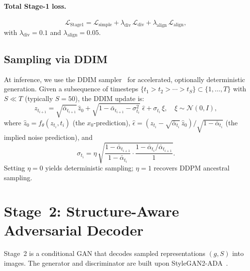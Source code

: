 \documentclass[12pt]{article}
\begin{document}
\paragraph{Total Stage-1 loss.}
\begin{equation}\label{eq:total-stage1-loss}
    \mathcal{L}_{\mathrm{Stage1}}
    = \mathcal{L}_{\mathrm{simple}}
    + \lambda_{\mathrm{div}}\, \mathcal{L}_{\mathrm{div}}
    + \lambda_{\mathrm{align}}\, \mathcal{L}_{\mathrm{align}},
\end{equation}
with $\lambda_{\mathrm{div}} = 0.1$ and $\lambda_{\mathrm{align}} = 0.05$.

\subsection{Sampling via DDIM}
\label{sec:ddim}

At inference, we use the DDIM sampler~\cite{song2021ddim}
for accelerated, optionally deterministic generation.
Given a subsequence of timesteps
$\{t_1 > t_2 > \cdots > t_S\} \subset \{1, \ldots, T\}$
with $S \ll T$ (typically $S = 50$), the DDIM update is:
\begin{equation}\label{eq:ddim-update}
    z_{t_{i+1}} = \sqrt{\bar{\alpha}_{t_{i+1}}}\,\hat{z}_0
    + \sqrt{1 - \bar{\alpha}_{t_{i+1}} - \sigma_{t_i}^2}\;\hat{\epsilon}
    + \sigma_{t_i}\, \xi,
    \quad \xi \sim \mathcal{N}(0, I),
\end{equation}
where $\hat{z}_0 = f_\theta(z_{t_i}, t_i)$ (the $x_0$-prediction),
$\hat{\epsilon} = (z_{t_i} - \sqrt{\bar{\alpha}_{t_i}}\,\hat{z}_0) / \sqrt{1 - \bar{\alpha}_{t_i}}$
(the implied noise prediction), and
\begin{equation}\label{eq:ddim-sigma}
    \sigma_{t_i} = \eta\,\sqrt{\frac{1 - \bar{\alpha}_{t_{i+1}}}{1 - \bar{\alpha}_{t_i}}
    \cdot \frac{1 - \bar{\alpha}_{t_i}/\bar{\alpha}_{t_{i+1}}}{1}}.
\end{equation}
Setting $\eta = 0$ yields deterministic sampling; $\eta = 1$ recovers
DDPM ancestral sampling.

\section{Stage~2: Structure-Aware Adversarial Decoder}
\label{sec:stage2}

Stage~2 is a conditional GAN that decodes sampled representations
$(g, S)$ into images.
The generator and discriminator are built upon
StyleGAN2-ADA~\cite{karras2020stylegan2,karras2020training}.
\end{document}
